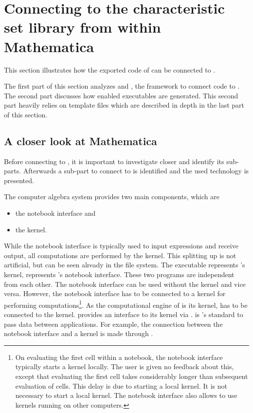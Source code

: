 \clearpage
\section{Connecting to the characteristic set library from within Mathematica}

This section illustrates how the exported code of  can be connected to \Mathematica.

The first part of this section analyzes \Mathematica and \MathLink, the framework to connect code to \Mathematica. The second part discusses how \MathLink enabled executables are generated. This second part heavily relies on template files which are described in depth in the last part of this section.

\subsection{A closer look at Mathematica}

Before connecting \exportedsymbol to \Mathematica, it is important to investigate \Mathematica closer and identify its sub-parts. Afterwards a sub-part to connect \exportedsymbol to is identified and the used technology is presented.

The computer algebra system \Mathematica\cite{Mathematica} provides two main components, which are 
\begin{itemize}
\item the notebook interface and 
\item the kernel.
\end{itemize}
While the notebook interface is typically used to input expressions and receive output, all computations are performed by the kernel. This splitting up is not artificial, but can be seen already in the file system. The executable  represents \Mathematica's kernel,  represents \Mathematica's notebook interface. These two programs are independent from each other. The notebook interface can be used without the kernel and vice versa. However, the notebook interface has to be connected to a kernel for performing computations\footnote{On evaluating the first cell within a notebook, the notebook interface typically starts a kernel locally. The user is given no feedback about this, except that evaluating the first cell takes considerably longer than subsequent evaluation of cells. This delay is due to starting a local kernel. It is not necessary to start a local kernel. The notebook interface also allows to use kernels running on other computers.}. As the computational engine of \Mathematica is its kernel, \exportedsymbol has to be connected to the kernel. \Mathematica provides an interface to its kernel via \MathLink. \MathLink\cite{MathLink} is \Mathematica's standard to pass data between applications. For example, the connection between the notebook interface and a kernel is made through \MathLink.

